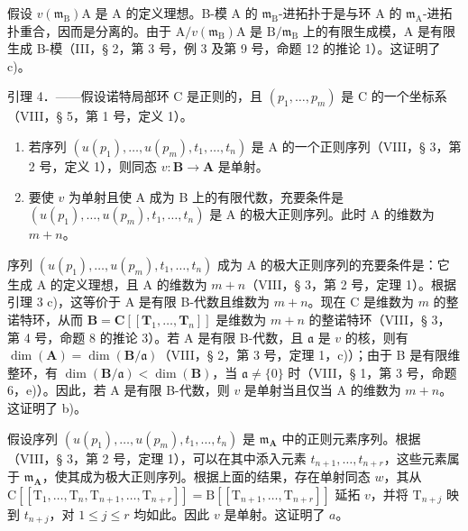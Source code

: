 假设 \(v(\mathfrak{m}_{\mathrm{B}})\)A 是 A 的定义理想。B-模 A 的 \(\mathfrak{m}_{\mathrm{B}}\)-进拓扑于是与环 A 的 \(\mathfrak{m}_{\mathrm{A}}\)-进拓扑重合，因而是分离的。由于 \(\mathrm{A} / v(\mathfrak{m}_{\mathrm{B}})\)A 是 \(\mathrm{B} / \mathfrak{m}_{\mathrm{B}}\) 上的有限生成模，A 是有限生成 B-模（III，§ 2，第 3 号，例 3 及第 9 号，命题 12 的推论 1）。这证明了 c)。

引理 4．——假设诺特局部环 C 是正则的，且 \((p_1, \ldots, p_m)\) 是 C 的一个坐标系（VIII，§ 5，第 1 号，定义 1）。

\begin{enumerate}
\def\labelenumi{\alph{enumi})}
\item
  若序列 \((u(p_1), \ldots, u(p_m), t_1, \ldots, t_n)\) 是 A 的一个正则序列（VIII，§ 3，第 2 号，定义 1），则同态 \(v: \mathbf{B} \to \mathbf{A}\) 是单射。
\item
  要使 \(v\) 为单射且使 A 成为 B 上的有限代数，充要条件是 \((u(p_1), \ldots, u(p_m), t_1, \ldots, t_n)\) 是 A 的极大正则序列。此时 A 的维数为 \(m + n\)。
\end{enumerate}

序列 \((u(p_1), \ldots, u(p_m), t_1, \ldots, t_n)\) 成为 A 的极大正则序列的充要条件是：它生成 A 的定义理想，且 A 的维数为 \(m + n\)（VIII，§ 3，第 2 号，定理 1）。根据引理 3 c)，这等价于 A 是有限 B-代数且维数为 \(m + n\)。现在 C 是维数为 \(m\) 的整诺特环，从而 \(\mathbf{B} = \mathbf{C}[[\mathbf{T}_1, \ldots, \mathbf{T}_n]]\) 是维数为 \(m + n\) 的整诺特环（VIII，§ 3，第 4 号，命题 8 的推论 3）。若 A 是有限 B-代数，且 \(\mathfrak{a}\) 是 \(v\) 的核，则有 \(\dim(\mathbf{A}) = \dim(\mathbf{B}/\mathfrak{a})\)（VIII，§ 2，第 3 号，定理 1，c)）；由于 B 是有限维整环，有 \(\dim(\mathbf{B}/\mathfrak{a}) < \dim(\mathbf{B})\)，当 \(\mathfrak{a} \neq \{0\}\) 时（VIII，§ 1，第 3 号，命题 6，e)）。因此，若 A 是有限 B-代数，则 \(v\) 是单射当且仅当 A 的维数为 \(m + n\)。这证明了 b)。

假设序列 \((u(p_1), \ldots, u(p_m), t_1, \ldots, t_n)\) 是 \(\mathfrak{m}_{\mathbf{A}}\) 中的正则元素序列。根据（VIII，§ 3，第 2 号，定理 1），可以在其中添入元素 \(t_{n+1}, \ldots, t_{n+r}\)，这些元素属于 \(\mathfrak{m}_{\mathbf{A}}\)，使其成为极大正则序列。根据上面的结果，存在单射同态 \(w\)，其从 \(\mathrm{C}[[\mathrm{T}_1, \ldots, \mathrm{T}_n, \mathrm{T}_{n+1}, \ldots, \mathrm{T}_{n+r}]] = \mathrm{B}[[\mathrm{T}_{n+1}, \ldots, \mathrm{T}_{n+r}]]\) 延拓 \(v\)，并将 \(\mathrm{T}_{n+j}\) 映到 \(t_{n+j}\)，对 \(1 \leqslant j \leqslant r\) 均如此。因此 \(v\) 是单射。这证明了 \(a\)。

